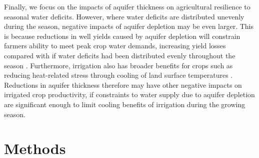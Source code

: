 \documentclass[
]{article}
\begin{document}
Finally, we focus on the impacts of aquifer thickness on agricultural resilience to seasonal water deficits. However, where water deficits are distributed unevenly during the season, negative impacts of aquifer depletion may be even larger. This is because reductions in well yields caused by aquifer depletion will constrain farmers ability to meet peak crop water demands, increasing yield losses compared with if water deficits had been distributed evenly throughout the season \citep{ortiz2019unpacking}. Furthermore, irrigation also has broader benefits for crops such as reducing heat-related stress through cooling of land surface temperatures \citep{adegoke2003impact, bonfils2007empirical, lobell2008effect, zhu2022untangling}. Reductions in aquifer thickness therefore may have other negative impacts on irrigated crop productivity, if constraints to water supply due to aquifer depletion are significant enough to limit cooling benefits of irrigation during the growing season. 




\hypertarget{methods}{%
\section{Methods}\label{methods}}
\end{document}
